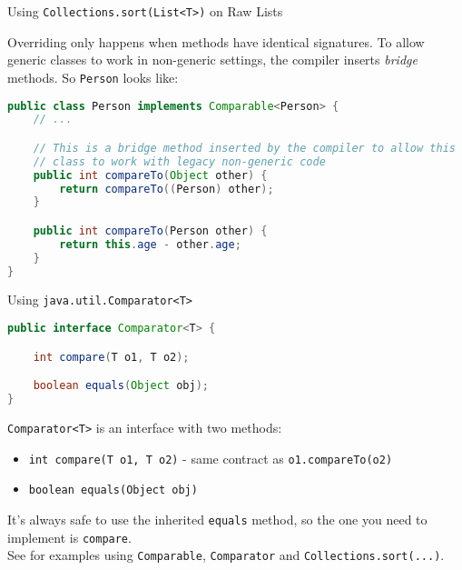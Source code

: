 \documentclass{beamer}
\begin{document}
\begin{frame}[fragile]{Using {\tt Collections.sort(List<T>)} on Raw Lists}

Overriding only happens when methods have identical signatures.  To allow generic classes to work in non-generic settings, the compiler inserts {\it bridge} methods.  So {\tt Person} looks like:

\begin{lstlisting}[language=Java]
public class Person implements Comparable<Person> {
    // ...

    // This is a bridge method inserted by the compiler to allow this
    // class to work with legacy non-generic code
    public int compareTo(Object other) {
        return compareTo((Person) other);
    }

    public int compareTo(Person other) {
        return this.age - other.age;
    }
}
\end{lstlisting}

\end{frame}


\begin{frame}[fragile]{Using {\tt java.util.Comparator<T>}}


\begin{lstlisting}[language=Java]
public interface Comparator<T> {

    int compare(T o1, T o2);

    boolean equals(Object obj);
}
\end{lstlisting}

{\tt Comparator<T>} is an interface with two methods:
\begin{itemize}
\item {\tt int compare(T o1, T o2)} -  same contract as {\tt o1.compareTo(o2)}
\item {\tt boolean equals(Object obj)}
\end{itemize}
It's always safe to use the inherited {\tt equals} method, so the one you need to implement is {\tt compare}.\\

See  for examples using {\tt Comparable}, {\tt Comparator} and {\tt Collections.sort(...)}.

\end{frame}
\end{document}
